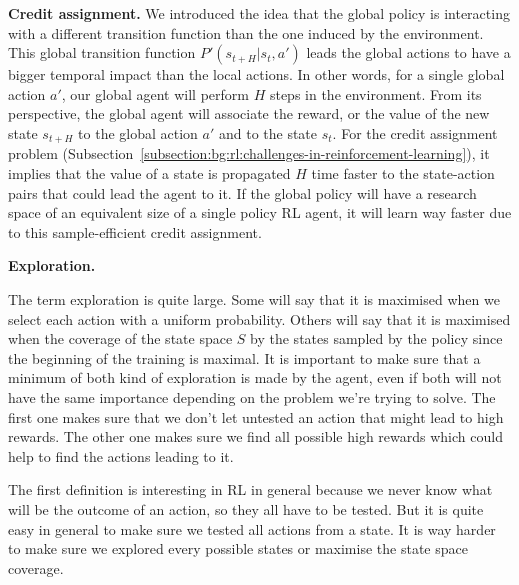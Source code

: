 \textbf{Credit assignment.}\label{paragraphe:bg:plan-rl:impact:credit-assignment}
We introduced the idea that the global policy is interacting with a different transition function than the one induced
by the environment.
This global transition function $P'(s_{t+H} | s_t, a')$ leads the global actions to have a bigger temporal impact than
the local actions.
In other words, for a single global action $a'$, our global agent will perform $H$ steps in the environment.
From its perspective, the global agent will associate the reward, or the value of the new state $s_{t+H}$ to the global
action $a'$ and to the state $s_t$.
For the credit assignment problem (Subsection~\ref{subsection:bg:rl:challenges-in-reinforcement-learning}), it implies
that the value of a state is propagated $H$ time faster to the state-action pairs that could lead the agent to it.
If the global policy will have a research space of an equivalent size of a single policy RL agent, it will learn way
faster due to this sample-efficient credit assignment.

\textbf{Exploration.}


The term exploration is quite large.
Some will say that it is maximised when we select each action with a uniform probability.
Others will say that it is maximised when the coverage of the state space $S$ by the states sampled by the policy since
the beginning of the training is maximal.
It is important to make sure that a minimum of both kind of exploration is made by the agent, even if both will not
have the same importance depending on the problem we're trying to solve.
The first one makes sure that we don't let untested an action that might lead to high rewards.
The other one makes sure we find all possible high rewards which could help to find the actions leading to it.

The first definition is interesting in RL in general because we never know what will be the outcome of an action, so
they all have to be tested.
But it is quite easy in general to make sure we tested all actions from a state.
It is way harder to make sure we explored every possible states or maximise the state space coverage.

